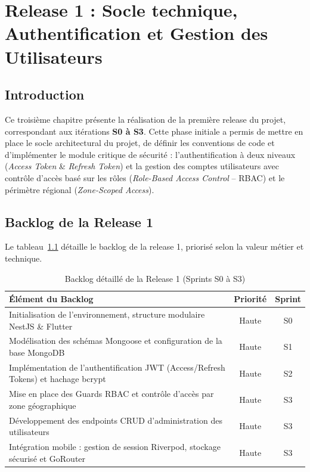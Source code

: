 \chapter{Release 1 : Socle technique, Authentification et Gestion des Utilisateurs}
\label{chap:sprint_socle}

\section*{Introduction}
Ce troisi\`eme chapitre pr\'esente la r\'ealisation de la premi\`ere release du projet, correspondant aux it\'erations \textbf{S0 \`a S3}. Cette phase initiale a permis de mettre en place le socle architectural du projet, de d\'efinir les conventions de code et d'impl\'ementer le module critique de s\'ecurit\'e : l'authentification \`a deux niveaux (\textit{Access Token} \& \textit{Refresh Token}) et la gestion des comptes utilisateurs avec contr\^ole d'acc\`es bas\'e sur les r\^oles (\textit{Role-Based Access Control} -- RBAC) et le p\'erim\`etre r\'egional (\textit{Zone-Scoped Access}).

\section{Backlog de la Release 1}
Le tableau~\ref{tab:backlog-release1} d\'etaille le backlog de la release 1, prioris\'e selon la valeur m\'etier et technique.

\begin{table}[H]
\centering
\begin{tabular}{|p{8.5cm}|c|c|}
\hline
\textbf{\'El\'ement du Backlog} & \textbf{Priorit\'e} & \textbf{Sprint} \\
\hline
Initialisation de l'environnement, structure modulaire NestJS \& Flutter & Haute & S0 \\
\hline
Mod\'elisation des sch\'emas Mongoose et configuration de la base MongoDB & Haute & S1 \\
\hline
Impl\'ementation de l'authentification JWT (Access/Refresh Tokens) et hachage bcrypt & Haute & S2 \\
\hline
Mise en place des Guards RBAC et contr\^ole d'acc\`es par zone g\'eographique & Haute & S3 \\
\hline
D\'eveloppement des endpoints CRUD d'administration des utilisateurs & Haute & S3 \\
\hline
Int\'egration mobile : gestion de session Riverpod, stockage s\'ecuris\'e et GoRouter & Haute & S3 \\
\hline
\end{tabular}
\caption{Backlog d\'etaill\'e de la Release 1 (Sprints S0 \`a S3)}
\label{tab:backlog-release1}
\end{table}

